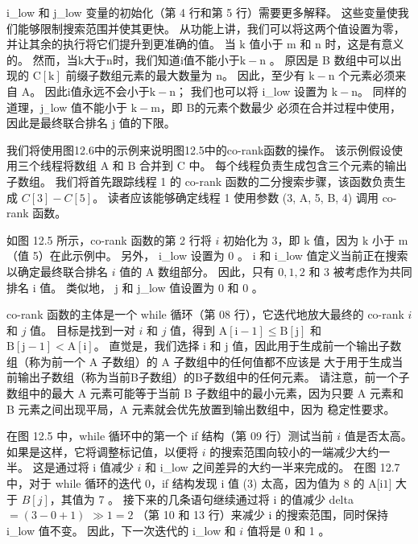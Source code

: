 i\_low 和 j\_low 变量的初始化（第 4 行和第 5 行）需要更多解释。 这些变量使我们能够限制搜索范围并使其更快。 从功能上讲，我们可以将这两个值设置为零，并让其余的执行将它们提升到更准确的值。 当 $\mathrm{k}$ 值小于 $\mathrm{m}$ 和 $\mathrm{n}$ 时，这是有意义的。 然而，当$\mathrm{k}$大于$\mathrm{n}$时，我们知道$\mathrm{i}$值不能小于$\mathrm{k}-\mathrm{n}$ 。 原因是 B 数组中可以出现的 $\mathrm{C}[\mathrm{k}]$ 前缀子数组元素的最大数量为 $\mathrm{n}$。 因此，至少有 $\mathrm{k}-\mathrm{n}$ 个元素必须来自 $\mathrm{A}$。 因此$\mathrm{i}$值永远不会小于$\mathrm{k}-\mathrm{n}$； 我们也可以将 i\_low 设置为 $\mathrm{k}-\mathrm{n}$。 同样的道理，$\mathrm{j}_{-}$low 值不能小于 $\mathrm{k}-\mathrm{m}$，即 $\mathrm{B 的元素个数最少 }$ 必须在合并过程中使用，因此是最终联合排名 $\mathrm{j}$ 值的下限。

我们将使用图12.6中的示例来说明图12.5中的co-rank函数的操作。 该示例假设使用三个线程将数组 $\mathrm{A}$ 和 $\mathrm{B}$ 合并到 $\mathrm{C}$ 中。 每个线程负责生成包含三个元素的输出子数组。 我们将首先跟踪线程 1 的 co-rank 函数的二分搜索步骤，该函数负责生成 $C[3]-C[5]$。 读者应该能够确定线程 1 使用参数 (3, A, 5, B, 4) 调用 co-rank 函数。

如图 12.5 所示，co-rank 函数的第 2 行将 $i$ 初始化为 3，即 $\mathrm{k}$ 值，因为 $\mathrm{k}$ 小于 $\mathrm{ m}$（值 5）在此示例中。 另外， i\_low 设置为 0 。 $\mathrm{i}$ 和 i\_low 值定义当前正在搜索以确定最终联合排名 $i$ 值的 A 数组部分。 因此，只有 $0,1,2$ 和 3 被考虑作为共同排名 i 值。 类似地， $\mathrm{j}$ 和 j\_low 值设置为 0 和 0 。

co-rank 函数的主体是一个 while 循环（第 08 行），它迭代地放大最终的 co-rank $i$ 和 $j$ 值。 目标是找到一对 $i$ 和 $j$ 值，得到 $\mathrm{A}[\mathrm{i}-1] \leq \mathrm{B}[\mathrm{j}]$ 和 $\mathrm{B}[\mathrm{j}-1]<\mathrm{A}[\mathrm{i}]$。 直觉是，我们选择 $\mathrm{i}$ 和 $\mathrm{j}$ 值，因此用于生成前一个输出子数组（称为前一个 A 子数组）的 A 子数组中的任何值都不应该是 大于用于生成当前输出子数组（称为当前B子数组）的B子数组中的任何元素。 请注意，前一个子数组中的最大 A 元素可能等于当前 B 子数组中的最小元素，因为只要 A 元素和 B 元素之间出现平局，A 元素就会优先放置到输出数组中，因为 稳定性要求。

在图 12.5 中，while 循环中的第一个 if 结构（第 09 行）测试当前 $i$ 值是否太高。 如果是这样，它将调整标记值，以便将 $i$ 的搜索范围向较小的一端减少大约一半。 这是通过将 i 值减少 $i$ 和 i\_low 之间差异的大约一半来完成的。 在图 12.7 中，对于 while 循环的迭代 0，if 结构发现 i 值 (3) 太高，因为值为 8 的 A[i$1]$ 大于 $B[j ]$，其值为 7 。 接下来的几条语句继续通过将 i 的值减少 delta $=(3-0+1)$ $\gg 1=2$ （第 10 和 13 行）来减少 i 的搜索范围，同时保持 i\_low 值不变。 因此，下一次迭代的 i\_low 和 $i$ 值将是 0 和 1 。

